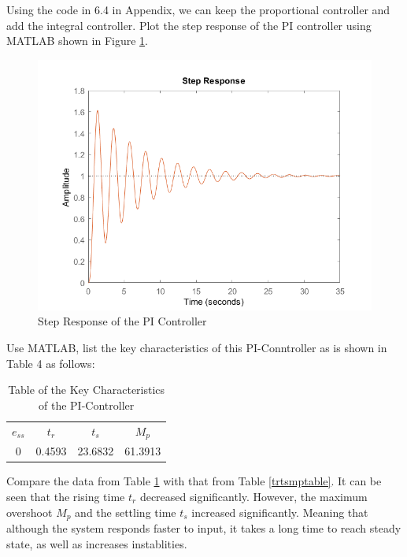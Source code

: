 \documentclass[a4paper, twocolumn, titlepage, 10pt]{article}
\begin{document}
		Using the code in 6.4 in Appendix, we can keep the proportional controller and add the integral controller. Plot the step response of the PI controller using MATLAB shown in Figure \ref{StepPI}.
		\begin{figure}[H]
			\centering
			\includegraphics[width=\linewidth]{StepPI}
			\caption{Step Response of the PI Controller}
			\label{StepPI}
		\end{figure}
	
		Use MATLAB, list the key characteristics of this PI-Conntroller as is shown in Table 4 as follows:
		\begin{table}[H]
			\centering
			\begin{tabular}{c c c c}
				$e_{ss}$ & $t_r$ & $t_s$ & $M_p$ \\
				0 & 0.4593 & 23.6832 & 61.3913
			\end{tabular}
			\caption{Table of the Key Characteristics of the PI-Controller}
			\label{responseCharPI}
		\end{table}
	
		Compare the data from Table \ref{responseCharPI} with that from Table \ref{trtsmptable}. It can be seen that the rising time $t_r$ decreased significantly. However, the maximum overshoot $M_p$ and the settling time $t_s$ increased significantly. Meaning that although the system responds faster to input, it takes a long time to reach steady state, as well as increases instablities. 
		
\end{document}
